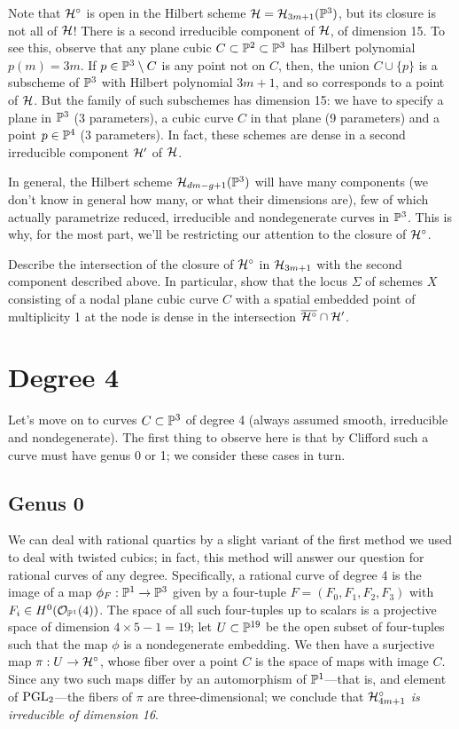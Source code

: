 Note that $\cH^\circ$ is open in the Hilbert scheme $\cH = \cH_{3m+1}(\PP^3)$, but its closure is not all of $\cH$! There is a second irreducible component of $\cH$, of dimension 15. To see this, observe that any plane cubic $C \subset \PP^2 \subset \PP^3$ has Hilbert polynomial $p(m) = 3m$. If $p \in \PP^3 \setminus C$ is any point not on $C$, then, the union $C \cup \{p\}$ is a subscheme of $\PP^3$ with Hilbert polynomial $3m+1$, and so corresponds to a point of $\cH$. But the family of such subschemes has dimension 15: we have to specify a plane in $\PP^3$ (3 parameters), a cubic curve $C$ in that plane (9 parameters) and a point $p \in \PP^4$ (3 parameters). In fact, these schemes are dense in a second irreducible component $\cH'$ of $\cH$.

In general, the Hilbert scheme $\cH_{dm-g+1}(\PP^3)$ will have many components (we don't know in general how many, or what their dimensions are), few of which actually parametrize reduced, irreducible and nondegenerate curves in $\PP^3$. This is why, for the most part, we'll be restricting our attention to the closure of $\cH^\circ$. 

\begin{exercise}
Describe the intersection of the closure  of $\cH^\circ$ in $\cH_{3m+1}$ with the second component described above. In particular, show that the locus $\Sigma$ of schemes $X$ consisting of a nodal plane cubic curve $C$ with a spatial embedded point of multiplicity 1 at the node is dense in the intersection $\overline{\cH^\circ} \cap \cH'$.
\end{exercise}

\section{Degree 4}

Let's move on to curves $C \subset \PP^3$ of degree 4 (always assumed smooth, irreducible and nondegenerate). The first thing to observe here is that by Clifford such a curve must have genus 0 or 1; we consider these cases in turn.

\subsection{Genus 0}

We can deal with rational quartics by a slight variant of the first method we used to deal with twisted cubics; in fact, this method will answer our question for rational curves of any degree. Specifically, a rational curve of degree 4 is the image of a map $\phi_F : \PP^1 \to \PP^3$ given by a four-tuple $F = (F_0,F_1,F_2,F_3)$ with $F_i \in H^0(\cO_{\PP^1}(4))$. The space of all such four-tuples up to scalars is a projective space of dimension $4 \times 5 - 1 = 19$; let $U \subset \PP^{19}$ be the open subset of four-tuples such that the map $\phi$ is a nondegenerate embedding. We then have a surjective map $\pi : U \to \cH^\circ$, whose fiber over a point $C$ is the space of maps with image $C$. Since any two such maps differ by an automorphism of $\PP^1$---that is, and element of $\PGL_2$---the fibers of $\pi$ are three-dimensional; we conclude that \emph{$\cH^\circ_{4m+1}$ is irreducible of dimension 16}.

